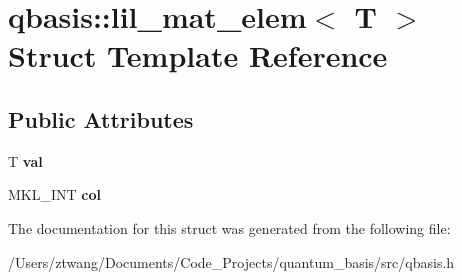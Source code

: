 \hypertarget{structqbasis_1_1lil__mat__elem}{}\section{qbasis\+:\+:lil\+\_\+mat\+\_\+elem$<$ T $>$ Struct Template Reference}
\label{structqbasis_1_1lil__mat__elem}
\subsection*{Public Attributes}
\begin{DoxyCompactItemize}
\item 
\mbox{\label{structqbasis_1_1lil__mat__elem_a1a1d9dcf23990f747e084c530a1b4189}} 
T {\bfseries val}
\item 
\mbox{\label{structqbasis_1_1lil__mat__elem_a922bec54c8758e717d0dca0876453adb}} 
M\+K\+L\+\_\+\+I\+NT {\bfseries col}
\end{DoxyCompactItemize}


The documentation for this struct was generated from the following file\+:\begin{DoxyCompactItemize}
\item 
/\+Users/ztwang/\+Documents/\+Code\+\_\+\+Projects/quantum\+\_\+basis/src/qbasis.\+h\end{DoxyCompactItemize}
